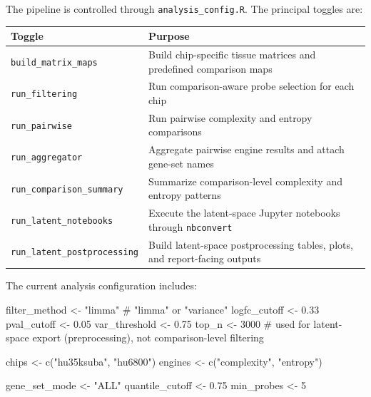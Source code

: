 \documentclass[
  letterpaper,
  DIV=11,
  numbers=noendperiod,
  openany,
  oneside]{scrreprt}
\newenvironment{Shaded}{\begin{snugshade}}{\end{snugshade}}
\newcommand{\CommentTok}[1]{\textcolor[rgb]{0.37,0.37,0.37}{#1}}
\newcommand{\DecValTok}[1]{\textcolor[rgb]{0.68,0.00,0.00}{#1}}
\newcommand{\FloatTok}[1]{\textcolor[rgb]{0.68,0.00,0.00}{#1}}
\newcommand{\FunctionTok}[1]{\textcolor[rgb]{0.28,0.35,0.67}{#1}}
\newcommand{\NormalTok}[1]{\textcolor[rgb]{0.00,0.23,0.31}{#1}}
\newcommand{\OtherTok}[1]{\textcolor[rgb]{0.00,0.23,0.31}{#1}}
\newcommand{\StringTok}[1]{\textcolor[rgb]{0.13,0.47,0.30}{#1}}
\begin{document}

The pipeline is controlled through \texttt{analysis\_config.R}. The
principal toggles are:

\begin{longtable}[]{@{}
  >{\raggedright\arraybackslash}p{}
  >{\raggedright\arraybackslash}p{}@{}}
\toprule\noalign{}
\begin{minipage}[b]{\linewidth}\raggedright
Toggle
\end{minipage} & \begin{minipage}[b]{\linewidth}\raggedright
Purpose
\end{minipage} \\
\midrule\noalign{}
\endhead
\bottomrule\noalign{}
\endlastfoot
\texttt{build\_matrix\_maps} & Build chip-specific tissue matrices and
predefined comparison maps \\
\texttt{run\_filtering} & Run comparison-aware probe selection for each
chip \\
\texttt{run\_pairwise} & Run pairwise complexity and entropy
comparisons \\
\texttt{run\_aggregator} & Aggregate pairwise engine results and attach
gene-set names \\
\texttt{run\_comparison\_summary} & Summarize comparison-level
complexity and entropy patterns \\
\texttt{run\_latent\_notebooks} & Execute the latent-space Jupyter
notebooks through \texttt{nbconvert} \\
\texttt{run\_latent\_postprocessing} & Build latent-space postprocessing
tables, plots, and report-facing outputs \\
\end{longtable}

The current analysis configuration includes:

\begin{Shaded}
\begin{Highlighting}[]
\NormalTok{filter\_method }\OtherTok{\textless{}{-}} \StringTok{"limma"}  \CommentTok{\# "limma" or "variance"}
\NormalTok{logfc\_cutoff  }\OtherTok{\textless{}{-}} \FloatTok{0.33}
\NormalTok{pval\_cutoff   }\OtherTok{\textless{}{-}} \FloatTok{0.05}
\NormalTok{var\_threshold }\OtherTok{\textless{}{-}} \FloatTok{0.75}
\NormalTok{top\_n         }\OtherTok{\textless{}{-}} \DecValTok{3000} \CommentTok{\# used for latent{-}space export (preprocessing), not comparison{-}level filtering}

\NormalTok{chips   }\OtherTok{\textless{}{-}} \FunctionTok{c}\NormalTok{(}\StringTok{"hu35ksuba"}\NormalTok{, }\StringTok{"hu6800"}\NormalTok{)}
\NormalTok{engines }\OtherTok{\textless{}{-}} \FunctionTok{c}\NormalTok{(}\StringTok{"complexity"}\NormalTok{, }\StringTok{"entropy"}\NormalTok{)}

\NormalTok{gene\_set\_mode   }\OtherTok{\textless{}{-}} \StringTok{"ALL"}
\NormalTok{quantile\_cutoff }\OtherTok{\textless{}{-}} \FloatTok{0.75}
\NormalTok{min\_probes      }\OtherTok{\textless{}{-}} \DecValTok{5}
\end{Highlighting}
\end{Shaded}
\end{document}

